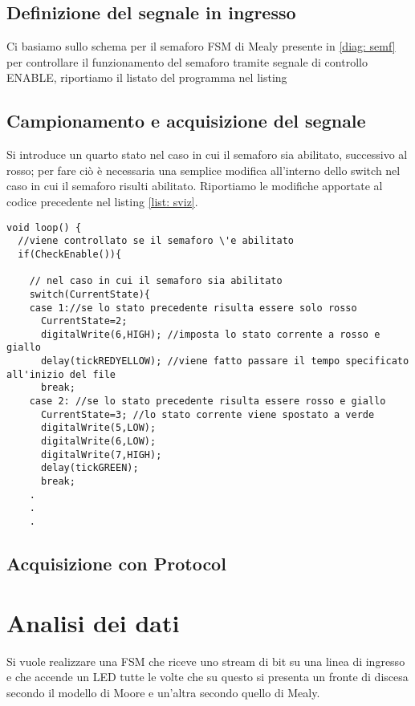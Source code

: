 \documentclass[10pt, a4paper, italian]{article}
\begin{document}
\subsection{Definizione del segnale in ingresso}
Ci basiamo sullo schema per il semaforo FSM di Mealy presente in
\cref{diag: semf} per controllare il funzionamento del semaforo tramite
segnale di controllo ENABLE, riportiamo il listato del programma nel listing

\subsection{Campionamento e acquisizione del segnale}
Si introduce un quarto stato nel caso in cui il semaforo sia abilitato,
successivo al rosso; per fare ciò è necessaria una semplice modifica
all'interno dello switch nel caso in cui il semaforo risulti abilitato.
Riportiamo le modifiche apportate al codice precedente nel listing
\ref{list: sviz}.
\begin{lstlisting}[label={list: sviz}, style=Arduino, caption=Svizzero.ino]
void loop() {
  //viene controllato se il semaforo \'e abilitato
  if(CheckEnable()){ 
    
    // nel caso in cui il semaforo sia abilitato
    switch(CurrentState){  
    case 1://se lo stato precedente risulta essere solo rosso
      CurrentState=2;
      digitalWrite(6,HIGH); //imposta lo stato corrente a rosso e giallo
      delay(tickREDYELLOW); //viene fatto passare il tempo specificato all'inizio del file
      break;
    case 2: //se lo stato precedente risulta essere rosso e giallo
      CurrentState=3; //lo stato corrente viene spostato a verde
      digitalWrite(5,LOW);
      digitalWrite(6,LOW);
      digitalWrite(7,HIGH);  
      delay(tickGREEN); 
      break; 
    .
    .
    .
\end{lstlisting}

\subsection{Acquisizione con Protocol}

\section{Analisi dei dati}
Si vuole realizzare una FSM che riceve uno stream di bit su una linea di
ingresso e che accende un LED tutte le volte che su questo si presenta un
fronte di discesa secondo il modello di Moore e un'altra secondo quello di
Mealy.
\end{document}
